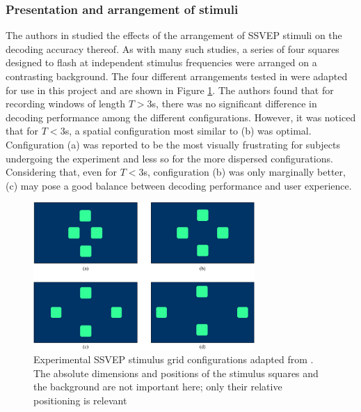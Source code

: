 \subsubsection{Presentation and arrangement of stimuli}
The authors in \cite{zhao-stimulus-layout-effect} studied the effects of the arrangement of SSVEP stimuli on the decoding accuracy thereof. As with many such studies, a series of four squares designed to flash at independent stimulus frequencies were arranged on a contrasting background. The four different arrangements tested in \cite{zhang-mset-cca} were adapted for use in this project and are shown in Figure \ref{fig:ssvep-grid-arrangements}. The authors found that for recording windows of length $T>3$s, there was no significant difference in decoding performance among the different configurations. However, it was noticed that for $T < 3$s, a spatial configuration most similar to (b) was optimal. Configuration (a) was reported to be the most visually frustrating for subjects undergoing the experiment and less so for the more dispersed configurations. Considering that, even for $T<3$s, configuration (b) was only marginally better, (c) may pose a good balance between decoding performance and user experience.

\begin{figure}[h]
    \centering
    \includegraphics[width=0.75\textwidth]{grid-arrangements}
    \caption[Experimental SSVEP stimulus grid configurations adapted from \cite{zhao-stimulus-layout-effect}]{Experimental SSVEP stimulus grid configurations adapted from \cite{zhao-stimulus-layout-effect}. The absolute dimensions and positions of the stimulus squares and the background are not important here; only their relative positioning is relevant}
    \label{fig:ssvep-grid-arrangements}
\end{figure}


